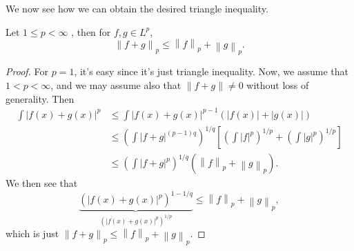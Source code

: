 We now see how we can obtain the desired triangle inequality.
\begin{theorem}\label{thm:Minkowski-inequality}
	Let \(1\leq p < \infty \) , then for \(f, g\in L^p\),
	\[
		\left\lVert f + g\right\rVert _p \leq  \left\lVert f\right\rVert _p + \left\lVert g\right\rVert _p.
	\]
\end{theorem}
\begin{proof}
	For \(p = 1\), it's easy since it's just triangle inequality. Now, we assume that \(1 < p < \infty \), and we may assume also that \(\left\lVert f + g\right\rVert \neq 0\) without loss of generality. Then
	\[
		\begin{split}
			\int \left\vert f(x) + g(x) \right\vert ^p &\leq \int \left\vert f(x) + g(x) \right\vert ^{p - 1}\left(\left\vert f(x) \right\vert + \left\vert g(x) \right\vert \right)\\
			&\leq  \left(\int \left\vert f+g \right\vert ^{(p-1)q}\right)^{1 / q}\left[\left(\int \left\vert f \right\vert^p \right)^{1 / p} + \left(\int \left\vert g \right\vert^p \right)^{1 / p}\right]\\
			&\leq  \left(\int \left\vert f + g \right\vert^p \right)^{1 / q}\left(\left\lVert f\right\rVert _p + \left\lVert g\right\rVert _p\right).
		\end{split}
	\]
	We then see that
	\[
		\underbrace{\left(\left\vert f(x) + g(x) \right\vert ^p\right)^{1 - 1 / q}}_{\left(\left\vert f(x) + g(x) \right\vert ^p\right)^{1 / p}} \leq \left\lVert f\right\rVert _p + \left\lVert g\right\rVert_p,
	\]
	which is just \(\left\lVert f + g\right\rVert _{p} \leq \left\lVert f\right\rVert _p + \left\lVert g\right\rVert_p\).
\end{proof}